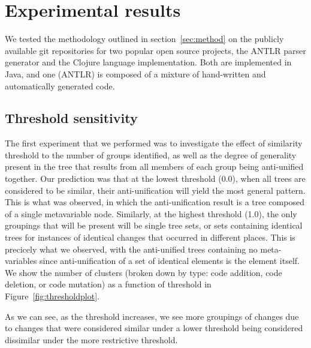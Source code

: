 \section{Experimental results}

We tested the methodology outlined in section~\ref{sec:method} on the
publicly available git repositories for two popular open source
projects, the ANTLR parser generator and the Clojure language implementation.
Both are implemented in Java, and one (ANTLR) is composed of a mixture of
hand-written and automatically generated code.  

\subsection{Threshold sensitivity}

The first experiment that we performed was to investigate the effect of
similarity threshold to the number of groups identified, as well as the degree
of generality present in the tree that results from all members of each group
being anti-unified together. Our prediction was that at the lowest threshold
(0.0), when all trees are considered to be similar, their anti-unification
will yield the most general pattern.  This is what was observed, in which the
anti-unification result is a tree composed of a single metavariable node.
Similarly, at the highest threshold (1.0), the only groupings that will be
present will be single tree sets, or sets containing identical trees for
instances of identical changes that occurred in different places.  This is
precicely what we observed, with the anti-unified trees containing no meta-
variables since anti-unification of a set of identical elements is the element
itself.  We show the number of clusters (broken down by type: code addition,
code deletion, or code mutation) as a function of threshold in
Figure~\ref{fig:thresholdplot}.

As we can see, as the threshold increases, we see more groupings of changes due to changes that were considered similar under a lower threshold being considered dissimilar under the more restrictive threshold.